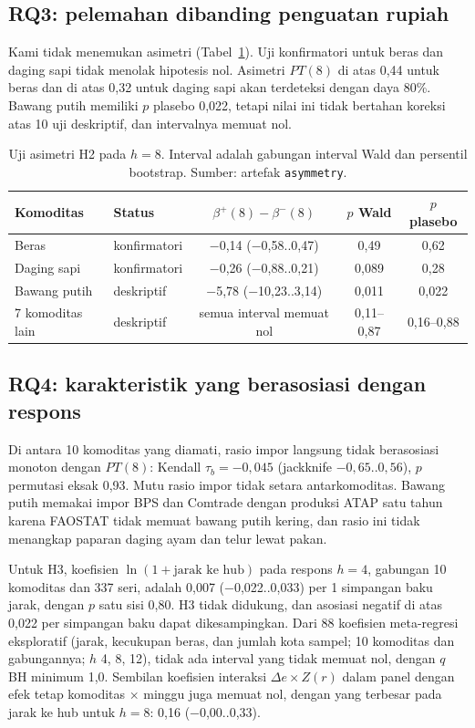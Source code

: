 \documentclass[11pt,a4paper]{article}
\newcommand{\ci}[2]{(#1..#2)}
\begin{document}
\subsection{RQ3: pelemahan dibanding penguatan rupiah}

Kami tidak menemukan asimetri (Tabel~\ref{tab:h2}). Uji konfirmatori untuk beras dan daging sapi tidak menolak hipotesis nol.
Asimetri $PT(8)$ di atas 0,44 untuk beras dan di atas 0,32 untuk daging sapi akan terdeteksi dengan daya 80\%. Bawang putih memiliki
$p$ plasebo 0,022, tetapi nilai ini tidak bertahan koreksi atas 10 uji deskriptif, dan intervalnya memuat nol.

\begin{table}[!htbp]
\centering\small
\caption{Uji asimetri H2 pada $h=8$. Interval adalah gabungan interval Wald dan persentil bootstrap. Sumber: artefak
\texttt{asymmetry}.}
\label{tab:h2}
\begin{tabular}{@{}l l c c c@{}}
\toprule
Komoditas & Status & $\beta^{+}(8)-\beta^{-}(8)$ & $p$ Wald & $p$ plasebo \\
\midrule
Beras & konfirmatori & −0,14 \ci{−0,58}{0,47} & 0,49 & 0,62 \\
Daging sapi & konfirmatori & −0,26 \ci{−0,88}{0,21} & 0,089 & 0,28 \\
Bawang putih & deskriptif & −5,78 \ci{−10,23}{3,14} & 0,011 & 0,022 \\
7 komoditas lain & deskriptif & semua interval memuat nol & 0,11–0,87 & 0,16–0,88 \\
\bottomrule
\end{tabular}
\end{table}

\subsection{RQ4: karakteristik yang berasosiasi dengan respons}

Di antara 10 komoditas yang diamati, rasio impor langsung tidak berasosiasi monoton dengan $PT(8)$: Kendall $\tau_b = -0,045$
(jackknife $-0,65$..$0,56$), $p$ permutasi eksak 0,93. Mutu rasio impor tidak setara antarkomoditas. Bawang putih memakai impor BPS
dan Comtrade dengan produksi ATAP satu tahun karena FAOSTAT tidak memuat bawang putih kering, dan rasio ini tidak menangkap paparan
daging ayam dan telur lewat pakan.

Untuk H3, koefisien $\ln(1+\text{jarak ke hub})$ pada respons $h=4$, gabungan 10 komoditas dan 337 seri, adalah 0,007
\ci{−0,022}{0,033} per 1 simpangan baku jarak, dengan $p$ satu sisi 0,80. H3 tidak didukung, dan asosiasi negatif di atas 0,022 per
simpangan baku dapat dikesampingkan. Dari 88 koefisien meta-regresi eksploratif (jarak, kecukupan beras, dan jumlah kota sampel;
10 komoditas dan gabungannya; $h$ 4, 8, 12), tidak ada interval yang tidak memuat nol, dengan $q$ BH minimum 1,0. Sembilan koefisien
interaksi $\Delta e \times Z(r)$ dalam panel dengan efek tetap komoditas $\times$ minggu juga memuat nol, dengan yang terbesar pada
jarak ke hub untuk $h=8$: 0,16 \ci{−0,00}{0,33}.
\end{document}
